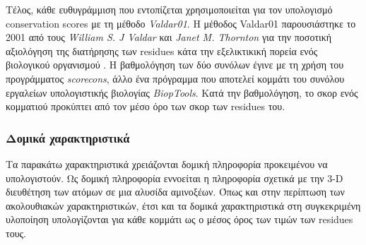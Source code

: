 \begin{itemize}
    Τέλος, κάθε ευθυγράμμιση που εντοπίζεται χρησιμοποιείται για τον υπολογισμό conservation scores με τη μέθοδο \textit{Valdar01}. H μέθοδος Valdar01 παρουσιάστηκε το 2001 από τους \textit{William S. J Valdar} και \textit{Janet M. Thornton} για την ποσοτική αξιολόγηση της διατήρησης των residues κάτα την εξελικτικική πορεία ενός βιολογικού οργανισμού \cite{Valdar2001}. Η βαθμολόγηση των δύο συνόλων έγινε με τη χρήση του προγράμματος \textit{scorecons}, άλλο ένα πρόγραμμα που αποτελεί κομμάτι του συνόλου εργαλείων υπολογιστικής βιολογίας \textit{BiopTools}. Κατά την βαθμολόγηση, το σκορ ενός κομματιού προκύπτει από τον μέσο όρο των σκορ των residues του.
    
\end{itemize}

\bigskip
\subsubsection{Δομικά χαρακτηριστικά}

Τα παρακάτω χαρακτηριστικά χρειάζονται δομική πληροφορία προκειμένου να υπολογιστούν. Ως δομική πληροφορία εννοείται η πληροφορία σχετικά με την 3-D διευθέτηση των ατόμων σε μια αλυσίδα αμινοξέων. Όπως και στην περίπτωση των ακολουθιακών χαρακτηριστικών, έτσι και τα δομικά χαρακτηριστικά στη συγκεκριμένη υλοποίηση υπολογίζονται για κάθε κομμάτι ως ο μέσος όρος των τιμών των residues τους. 


